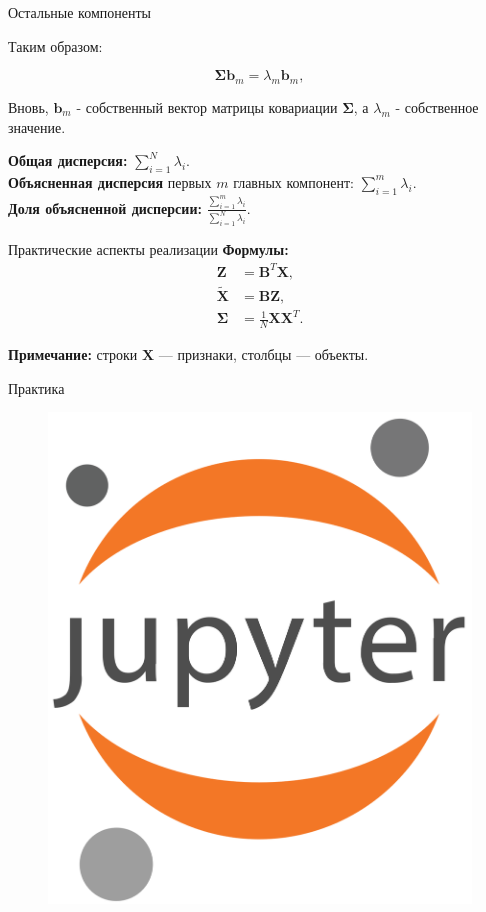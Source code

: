 \begin{frame}[allowframebreaks]{Остальные компоненты}
    \framebreak

    Таким образом:

    $$
        \boldsymbol{\Sigma}\boldsymbol{b}_m = \lambda_m\boldsymbol{b}_m,
    $$

    Вновь, $\boldsymbol{b}_m$ - собственный вектор матрицы ковариации $\boldsymbol{\Sigma}$, а $\lambda_m$ - собственное значение.

    \textbf{Общая дисперсия:} $\sum_{i=1}^N\lambda_i$. \\
    \textbf{Объясненная дисперсия} первых $m$ главных компонент: $\sum_{i=1}^m\lambda_i$. \\
    \textbf{Доля объясненной дисперсии:} $\frac{\sum_{i=1}^m\lambda_i}{\sum_{i=1}^N\lambda_i}$.
\end{frame}

\begin{frame}{Практические аспекты реализации}
    \textbf{Формулы:}
    \begin{align*}
        \boldsymbol{Z}         & = \mathbf{B}^T \boldsymbol{X},                \\
        \tilde{\boldsymbol{X}} & = \mathbf{B} \boldsymbol{Z},                  \\
        \boldsymbol{\Sigma}    & = \frac{1}{N}\boldsymbol{X} \boldsymbol{X}^T.
    \end{align*}

    \textbf{Примечание:} строки \(\boldsymbol{X}\) — признаки, столбцы — объекты.
\end{frame}

\begin{frame}{Практика}
    \begin{figure}
        \centering
        \includegraphics[width=.3\textwidth]{../resources/overall/Jupyter_logo.png}
    \end{figure}
\end{frame}
